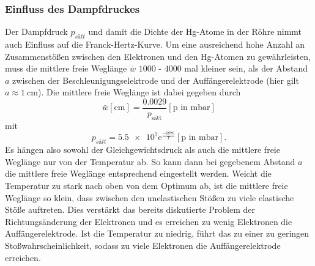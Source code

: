 \subsubsection*{Einfluss des Dampfdruckes}
Der Dampfdruck $p_{sätt}$ und damit die Dichte der Hg-Atome in der Röhre nimmt auch Einfluss auf die Franck-Hertz-Kurve. Um eine ausreichend
hohe Anzahl an Zusammenstößen zwischen den Elektronen und den Hg-Atomen zu gewährleisten, muss die mittlere freie Weglänge $\bar{w}$
$\num{1000}$ - $\num{4000}$ mal kleiner sein, als der Abstand $a$ zwischen der Beschleunigungselektrode und der Auffängerelektrode (hier gilt
$a\approx\SI{1}{\centi\metre}$). Die mittlere freie Weglänge ist dabei gegeben durch
\begin{equation}
    \bar{w}[\si{\centi\metre}]=\frac{\num{0.0029}}{p_\text{sätt}} [\text{p in } \si{\milli\bar}]
    \label{eqn:freieweglaengetheorie}
\end{equation}
mit
\begin{equation}
    p_{sätt}=\num{5.5e7}\text{e}^{\frac{-6876}{T}} [\text{p in }\si{\milli\bar}] .
    \label{eqn:sättigungsdampfdrtheorie}
\end{equation}
Es hängen also sowohl der Gleichgewichtsdruck als auch die mittlere freie Weglänge nur von der Temperatur ab. So kann dann bei gegebenem
Abstand $a$ die mittlere freie Weglänge entsprechend eingestellt werden. Weicht die Temperatur zu stark nach oben von dem Optimum ab, ist die
mittlere freie Weglänge so klein, dass zwischen den unelastischen Stößen zu viele elastische Stöße auftreten. Dies verstärkt das bereits
diskutierte Problem der Richtungsänderung der Elektronen und es erreichen zu wenig Elektronen die Auffängerelektrode. Ist die Temperatur zu
niedrig, führt das zu einer zu geringen Stoßwahrscheinlichkeit, sodass zu viele Elektronen die Auffängerelektrode erreichen.
